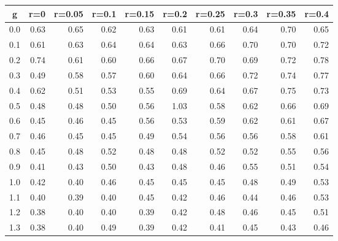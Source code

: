 %
\begin{table}[!tbp]
 \begin{center}
 \begin{tabular}{rrrrrrrrrr}\hline\hline
\multicolumn{1}{c}{g}&\multicolumn{1}{c}{r=0}&\multicolumn{1}{c}{r=0.05}&\multicolumn{1}{c}{r=0.1}&\multicolumn{1}{c}{r=0.15}&\multicolumn{1}{c}{r=0.2}&\multicolumn{1}{c}{r=0.25}&\multicolumn{1}{c}{r=0.3}&\multicolumn{1}{c}{r=0.35}&\multicolumn{1}{c}{r=0.4}\tabularnewline
\hline
0.0&0.63&0.65&0.62&0.63&0.61&0.61&0.64&0.70&0.65\tabularnewline
0.1&0.61&0.63&0.64&0.64&0.63&0.66&0.70&0.70&0.72\tabularnewline
0.2&0.74&0.61&0.60&0.66&0.67&0.70&0.69&0.72&0.78\tabularnewline
0.3&0.49&0.58&0.57&0.60&0.64&0.66&0.72&0.74&0.77\tabularnewline
0.4&0.62&0.51&0.53&0.55&0.69&0.64&0.67&0.75&0.73\tabularnewline
0.5&0.48&0.48&0.50&0.56&1.03&0.58&0.62&0.66&0.69\tabularnewline
0.6&0.45&0.46&0.45&0.56&0.53&0.59&0.62&0.61&0.67\tabularnewline
0.7&0.46&0.45&0.45&0.49&0.54&0.56&0.56&0.58&0.61\tabularnewline
0.8&0.45&0.48&0.52&0.48&0.48&0.52&0.52&0.55&0.56\tabularnewline
0.9&0.41&0.43&0.50&0.43&0.48&0.46&0.55&0.51&0.54\tabularnewline
1.0&0.42&0.40&0.46&0.45&0.45&0.45&0.48&0.49&0.53\tabularnewline
1.1&0.40&0.39&0.40&0.45&0.42&0.46&0.44&0.46&0.53\tabularnewline
1.2&0.38&0.40&0.40&0.39&0.42&0.48&0.46&0.45&0.51\tabularnewline
1.3&0.38&0.40&0.49&0.39&0.42&0.41&0.45&0.43&0.46\tabularnewline
\hline
\end{tabular}

\end{center}

\end{table}

